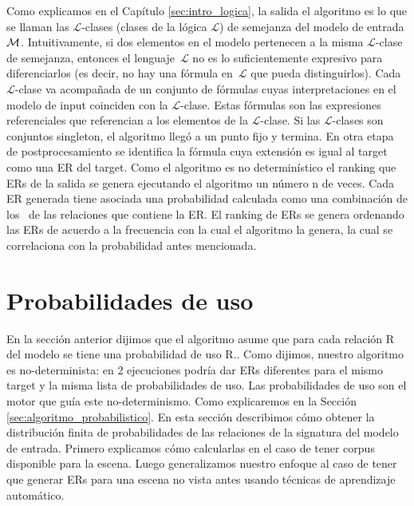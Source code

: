 Como explicamos en el Cap\'itulo \ref{sec:intro_logica}, la salida el algoritmo es lo que se llaman las $\mathcal {L}$-clases (clases de la l\'ogica $\mathcal {L}$) de semejanza del modelo de entrada $\mathcal{M} $. Intuitivamente, si dos elementos en el modelo pertenecen a la misma $\mathcal {L}$-clase de semejanza, entonces el lenguaje~$\mathcal {L}$ no es lo suficientemente expresivo para diferenciarlos (es decir, no hay una f\'ormula en~$\mathcal {L }$ que pueda distinguirlos). Cada  $\mathcal {L}$-clase va acompa\~nada de un conjunto de f\'ormulas cuyas interpretaciones en el modelo de input coinciden con la $\mathcal {L}$-clase. Estas f\'ormulas son las expresiones referenciales que referencian a los elementos de la $\mathcal {L}$-clase. Si las $\mathcal {L}$-clases son conjuntos singleton, el algoritmo lleg\'o a un punto fijo y termina. En otra etapa de postprocesamiento se identifica la f\'ormula cuya extensi\'on es igual al target como una ER del target. Como el algoritmo es no determin\'istico el ranking que ERs de la salida se genera ejecutando el algoritmo un n\'umero n de veces. Cada ER generada tiene asociada una probabilidad calculada como una combinaci\'on de los \puse\ de las relaciones que contiene la ER. El ranking de ERs se genera ordenando las ERs de acuerdo a la frecuencia con la cual el algoritmo la genera, la cual se correlaciona con la probabilidad antes mencionada.


\section{Probabilidades de uso}
\label{sec:learning}

En la secci\'on anterior dijimos que el algoritmo asume que para cada relaci\'on R del modelo se tiene una probabilidad de uso R.\puse. Como dijimos, nuestro algoritmo es no-determinista: en 2 ejecuciones podr\'ia dar ERs diferentes para el mismo target y la misma lista de probabilidades de uso. Las probabilidades de uso son el motor que gu\'ia este no-determinismo. Como explicaremos en la Secci\'on \ref{sec:algoritmo_probabilistico}. En esta secci\'on describimos c\'omo obtener la distribuci\'on finita de probabilidades de las relaciones de la signatura del modelo de entrada. Primero explicamos c\'omo calcularlas en el caso de tener corpus disponible para la escena. Luego generalizamos nuestro enfoque al caso de tener que generar ERs para una escena no vista antes usando t\'ecnicas de aprendizaje autom\'atico.  

